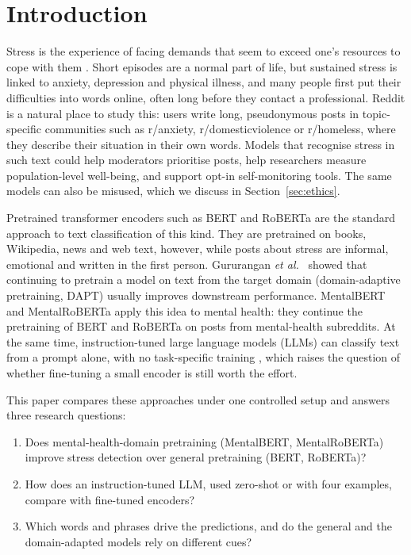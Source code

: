 \section{Introduction}
Stress is the experience of facing demands that seem to exceed one's resources to cope with them
\cite{lazarus1984stress}. Short episodes are a normal part of life, but sustained stress is linked to
anxiety, depression and physical illness, and many people first put their difficulties into words
online, often long before they contact a professional. Reddit is a natural place to study this:
users write long, pseudonymous posts in topic-specific communities such as r/anxiety,
r/domesticviolence or r/homeless, where they describe their situation in their own words. Models
that recognise stress in such text could help moderators prioritise posts, help researchers measure
population-level well-being, and support opt-in self-monitoring tools. The same models can also be
misused, which we discuss in Section~\ref{sec:ethics}.

Pretrained transformer encoders such as BERT \cite{devlin2019bert} and RoBERTa \cite{liu2019roberta}
are the standard approach to text classification of this kind. They are pretrained on books,
Wikipedia, news and web text, however, while posts about stress are informal, emotional and
written in the first person. Gururangan {\it et al.}~ showed that continuing to pretrain a model
on text from the target domain (domain-adaptive pretraining, DAPT) usually improves downstream
performance. MentalBERT and MentalRoBERTa \cite{ji2022mentalbert} apply this idea to mental health:
they continue the pretraining of BERT and RoBERTa on posts from mental-health subreddits. At the
same time, instruction-tuned large language models (LLMs) can classify text from a prompt alone,
with no task-specific training \cite{brown2020language,xu2024mentalllm}, which raises the question of
whether fine-tuning a small encoder is still worth the effort.

This paper compares these approaches under one controlled setup and answers three research questions:
\begin{enumerate}
  \item[\textbf{RQ1}] Does mental-health-domain pretraining (MentalBERT, MentalRoBERTa) improve stress
        detection over general pretraining (BERT, RoBERTa)?
  \item[\textbf{RQ2}] How does an instruction-tuned LLM, used zero-shot or with four examples, compare
        with fine-tuned encoders?
  \item[\textbf{RQ3}] Which words and phrases drive the predictions, and do the general and the
        domain-adapted models rely on different cues?
\end{enumerate}

